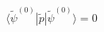 \begin{equation}
\langle \tilde\psi^{(0)}|\tilde p|\tilde\psi^{(0)}\rangle=0
\nonumber
\end{equation}

